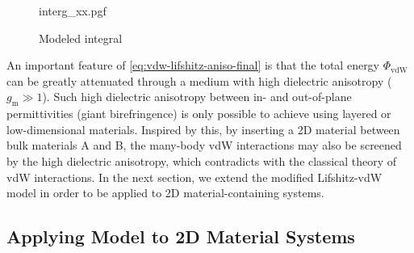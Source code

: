\begin{figure}[h]
  \centering{}
  {interg_xx.pgf}
  \caption{\label{fig:vdw-integeral-x}%
    Modeled integral 
  }
\end{figure}

An important feature of \autoref{eq:vdw-lifshitz-aniso-final} is that
the total energy $\Phi_{\mathrm{vdW}}$ can be greatly attenuated
through a medium with high dielectric anisotropy (\ie
$g_{\mathrm{m}} \gg 1$).
%
Such high dielectric anisotropy between in- and out-of-plane
permittivities (giant birefringence) is only possible to achieve using
layered \cite{Collin_1958_aniso,Weber_2000_aniso} or low-dimensional
\cite{Niu_2018_aniso,Segura_2018_aniso} materials. Inspired by this,
by inserting a 2D material between bulk materials A and B, the
many-body  vdW interactions may also be
screened by the high dielectric anisotropy, which contradicts with the classical theory of vdW interactions. 
%
In the next section, we extend the modified Lifshitz-vdW model in
order to be applied to 2D material-containing systems.


\subsection{Applying Model to 2D Material Systems}
\label{sec:vdw-model-2D}

